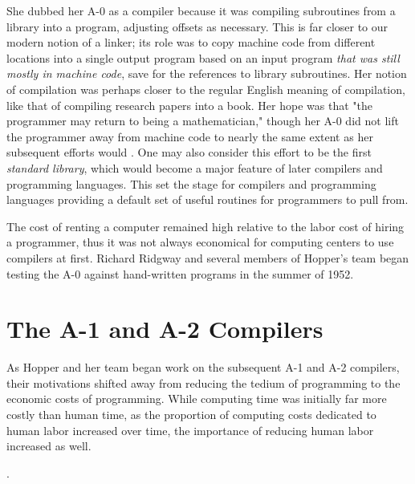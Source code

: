 She dubbed her A-0 as a compiler because it was compiling subroutines from a
library into a program, adjusting offsets as necessary. This is far closer to
our modern notion of a linker; its role was to copy machine code from different
locations into a single output program based on an input program \textit{that
    was still mostly in machine code}, save for the references to library
subroutines. Her notion of compilation was perhaps closer to the regular
English meaning of compilation, like that of compiling research papers into a
book. Her hope was that "the programmer may return to being a mathematician,"
though her A-0 did not lift the programmer away from machine code to nearly the
same extent as her subsequent efforts would
\cite{education_of_a_computer_1952_hopper}. One may also consider this effort
to be the first \textit{standard library}, which would become a major feature
of later compilers and programming languages. This set the stage for compilers
and programming languages providing a default set of useful routines for
programmers to pull from.

The cost of renting a computer remained high relative to the labor cost of
hiring a programmer, thus it was not always economical for computing centers to
use compilers at first. Richard Ridgway and several members of Hopper's team
began testing the A-0 against hand-written programs in the summer of 1952.

\section{The A-1 and A-2 Compilers}

As Hopper and her team began work on the subsequent A-1 and A-2 compilers,
their motivations shifted away from reducing the tedium of programming to the
economic costs of programming. While computing time was initially far more
costly than human time, as the proportion of computing costs dedicated to human
labor increased over time, the importance of reducing human labor increased as
well.

.


